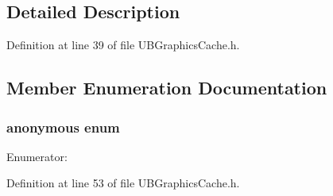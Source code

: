 \subsection{Detailed Description}


Definition at line 39 of file U\-B\-Graphics\-Cache.\-h.



\subsection{Member Enumeration Documentation}
\hypertarget{class_u_b_graphics_cache_a51142ffae19dd793b126d69433117edc}{\subsubsection[{anonymous enum}]{\setlength{\rightskip}{0pt plus 5cm}anonymous enum}}\label{d4/d5c/class_u_b_graphics_cache_a51142ffae19dd793b126d69433117edc}
\begin{Desc}
\item[Enumerator\-: ]\par
\begin{description}
\item[{\em 
\hypertarget{class_u_b_graphics_cache_a51142ffae19dd793b126d69433117edcae2a2971867d7c709556783d664814bbd}{Type}\label{d4/d5c/class_u_b_graphics_cache_a51142ffae19dd793b126d69433117edcae2a2971867d7c709556783d664814bbd}
}]\end{description}
\end{Desc}



Definition at line 53 of file U\-B\-Graphics\-Cache.\-h.

